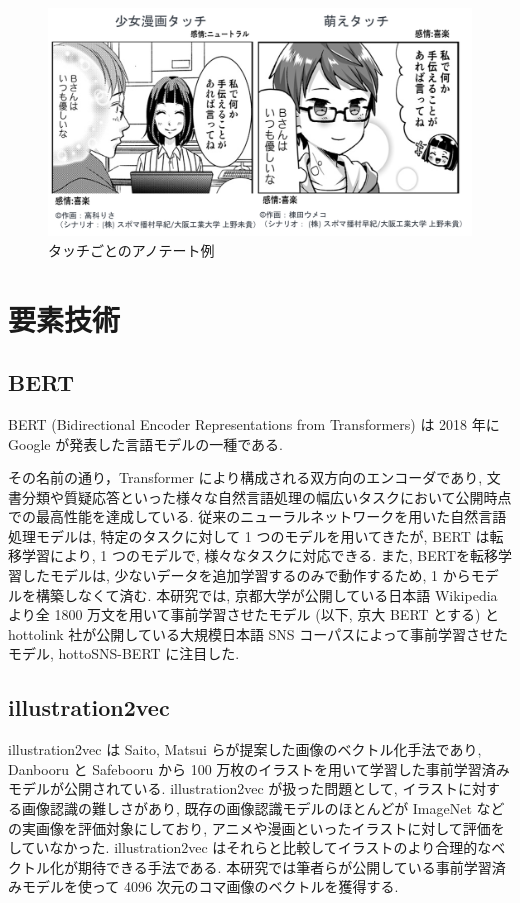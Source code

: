\documentclass[twocolumn]{jarticle}     %
\begin{document}
\begin{figure}[t]
  \centering
  \includegraphics[width=\linewidth]{4koma.png}
  \caption{タッチごとのアノテート例}
  \label{fig:4koma}
\end{figure}

\section{要素技術}
\subsection{BERT}
BERT (Bidirectional Encoder Representations from Transformers)\cite{BERT} は 2018 年に Google が発表した言語モデルの一種である.

その名前の通り，Transformer により構成される双方向のエンコーダであり, 文書分類や質疑応答といった様々な自然言語処理の幅広いタスクにおいて公開時点での最高性能を達成している.
従来のニューラルネットワークを用いた自然言語処理モデルは, 特定のタスクに対して 1 つのモデルを用いてきたが, BERT は転移学習により, 1 つのモデルで, 様々なタスクに対応できる. また, BERTを転移学習したモデルは, 少ないデータを追加学習するのみで動作するため, 1 からモデルを構築しなくて済む. 本研究では, 京都大学が公開している日本語 Wikipedia より全 1800 万文を用いて事前学習させたモデル\cite{kyoto-bert} (以下, 京大 BERT とする) と hottolink 社が公開している大規模日本語 SNS コーパスによって事前学習させたモデル, hottoSNS-BERT \cite{hottoSNS-bert} に注目した.
\newpage

\subsection{illustration2vec}
illustration2vec \cite{i2v} は Saito, Matsui らが提案した画像のベクトル化手法であり, Danbooru と Safebooru から 100 万枚のイラストを用いて学習した事前学習済みモデルが公開されている. illustration2vec が扱った問題として, イラストに対する画像認識の難しさがあり, 既存の画像認識モデルのほとんどが ImageNet などの実画像を評価対象にしており, アニメや漫画といったイラストに対して評価をしていなかった. illustration2vec はそれらと比較してイラストのより合理的なベクトル化が期待できる手法である. 本研究では筆者らが公開している事前学習済みモデルを使って 4096 次元のコマ画像のベクトルを獲得する.
\end{document}

